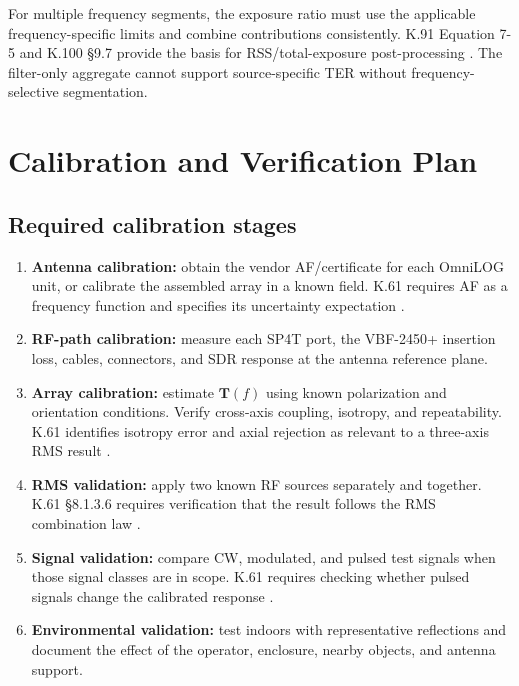 \documentclass[11pt,a4paper]{article}
\begin{document}
For multiple frequency segments, the exposure ratio must use the applicable frequency-specific limits and combine contributions consistently. K.91 Equation 7-5 and K.100 §9.7 provide the basis for RSS/total-exposure post-processing \cite{ITU-T-K.91,ITU-T-K.100}. The filter-only aggregate cannot support source-specific TER without frequency-selective segmentation.

\section{Calibration and Verification Plan}

\subsection{Required calibration stages}
\begin{enumerate}
  \item \textbf{Antenna calibration:} obtain the vendor AF/certificate for each OmniLOG unit, or calibrate the assembled array in a known field. K.61 requires AF as a frequency function and specifies its uncertainty expectation \cite[Sec.~8.1.3.2]{ITU-T-K.61}.
  \item \textbf{RF-path calibration:} measure each SP4T port, the VBF-2450+ insertion loss, cables, connectors, and SDR response at the antenna reference plane.
  \item \textbf{Array calibration:} estimate $\bm{T}(f)$ using known polarization and orientation conditions. Verify cross-axis coupling, isotropy, and repeatability. K.61 identifies isotropy error and axial rejection as relevant to a three-axis RMS result \cite[Secs.~8.1.3.3 and 8.1.3.7]{ITU-T-K.61}.
  \item \textbf{RMS validation:} apply two known RF sources separately and together. K.61 §8.1.3.6 requires verification that the result follows the RMS combination law \cite[Sec.~8.1.3.6]{ITU-T-K.61}.
  \item \textbf{Signal validation:} compare CW, modulated, and pulsed test signals when those signal classes are in scope. K.61 requires checking whether pulsed signals change the calibrated response \cite[Sec.~8.1.3.5]{ITU-T-K.61}.
  \item \textbf{Environmental validation:} test indoors with representative reflections and document the effect of the operator, enclosure, nearby objects, and antenna support.
\end{enumerate}
\end{document}
